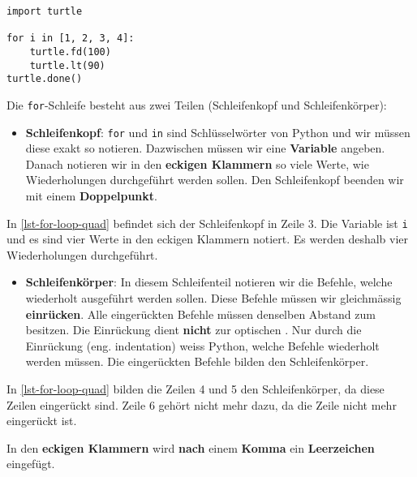 \begin{lstlisting}[caption={Zeile vier und fünf wird jeweils viermal ausgeführt (\graybgtexttt{quadrat\_loop.py}).}, label=lst-for-loop-quad]
import turtle
 
for i in [1, 2, 3, 4]:
    turtle.fd(100)
    turtle.lt(90)
turtle.done()
\end{lstlisting}

Die \lstinline{for}-Schleife besteht aus zwei Teilen (Schleifenkopf und Schleifenkörper):

\begin{itemize}
	\item \textbf{Schleifenkopf}: \lstinline{for} und \lstinline{in} sind Schlüsselwörter von Python und wir müssen diese exakt so notieren. Dazwischen müssen wir eine \textbf{Variable} angeben. Danach notieren wir in den \textbf{eckigen Klammern} so viele Werte, wie Wiederholungen durchgeführt werden sollen. Den Schleifenkopf beenden wir mit einem \textbf{Doppelpunkt}.
\end{itemize}

\begin{example}
	In \autoref{lst-for-loop-quad} befindet sich der Schleifenkopf in Zeile $3$. Die Variable ist \lstinline{i} und es sind vier Werte in den eckigen Klammern notiert. Es werden deshalb vier Wiederholungen durchgeführt.
\end{example}

\begin{itemize}
	\item \textbf{Schleifenkörper}: In diesem Schleifenteil notieren wir die Befehle, welche wiederholt ausgeführt werden sollen. Diese Befehle müssen wir gleichmässig \textbf{einrücken}. Alle eingerückten Befehle müssen denselben Abstand zum  besitzen. Die Einrückung dient \textbf{nicht} zur optischen . Nur durch die Einrückung (eng. indentation) weiss Python, welche Befehle wiederholt werden müssen. Die eingerückten Befehle bilden den Schleifenkörper.
\end{itemize}

\begin{example}
	In \autoref{lst-for-loop-quad} bilden die Zeilen \num{4} und \num{5} den Schleifenkörper, da diese Zeilen eingerückt sind. Zeile \num{6} gehört nicht mehr dazu, da die Zeile nicht mehr eingerückt ist.
\end{example}

\begin{cleancode}[Leerzeichen 3]
In den \textbf{eckigen Klammern} wird \textbf{nach} einem \textbf{Komma} ein \textbf{Leerzeichen} eingefügt.
\end{cleancode}

